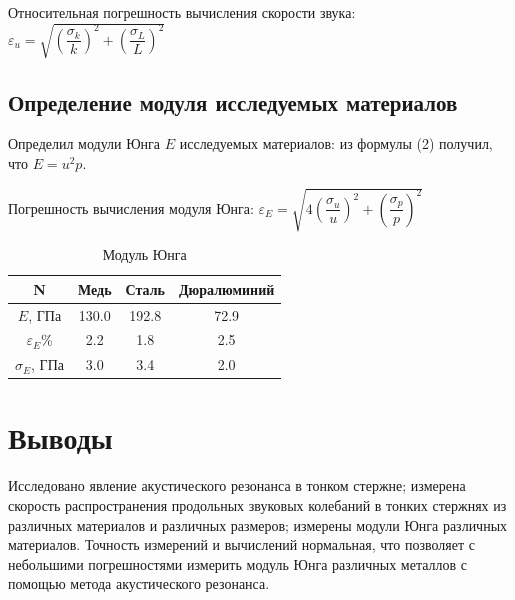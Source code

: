 \documentclass[a4paper]{article}
\begin{document}
\item Относительная погрешность вычисления скорости звука: $\varepsilon_u = \sqrt{\left(\dfrac{\sigma_{k}}{k}\right)^2 + \left(\dfrac{\sigma_L}{L}\right)^2}$

\subsection{Определение модуля исследуемых материалов}

\item Определил модули Юнга $E$ исследуемых материалов: из формулы (2) получил, что $E = u^2p$.

\item Погрешность вычисления модуля Юнга: $\varepsilon_E = \sqrt{4\left(\dfrac{\sigma_{u}}{u}\right)^2 + \left(\dfrac{\sigma_p}{p}\right)^2}$

\begin{table}[h!]
\centering
\caption{Модуль Юнга}
\begin{tabular}{|c|c|c|c|}
\hline
N & Медь & Сталь & Дюралюминий \\ \hline
$E$, ГПа & 130.0 & 192.8 & 72.9 \\ \hline
$\varepsilon_E$\% & 2.2 & 1.8 & 2.5 \\ \hline
$\sigma_E$, ГПа & 3.0 & 3.4 & 2.0 \\ \hline
\end{tabular}
\end{table}


\section{Выводы}
 Исследовано явление акустического резонанса в тонком стержне; измерена скорость распространения продольных звуковых колебаний в тонких стержнях из различных материалов и различных размеров; измерены модули Юнга различных материалов. Точность измерений и вычислений нормальная, что позволяет с небольшими погрешностями измерить модуль Юнга различных металлов с помощью метода акустического резонанса.
\end{document}
